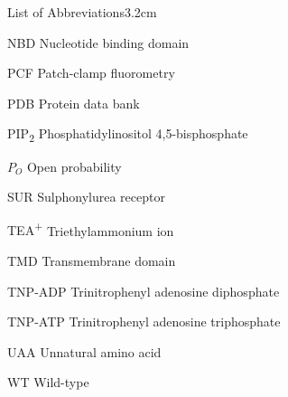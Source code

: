 \begin{mclistof}{List of Abbreviations}{3.2cm}
\item[NBD] Nucleotide binding domain

\item[PCF] Patch-clamp fluorometry

\item[PDB] Protein data bank

\item[PIP\textsubscript{2}] Phosphatidylinositol 4,5-bisphosphate

\item[$P_O$] Open probability

\item[SUR] Sulphonylurea receptor

\item[TEA\textsuperscript{+}] Triethylammonium ion

\item[TMD] Transmembrane domain

\item[TNP-ADP] Trinitrophenyl adenosine diphosphate

\item[TNP-ATP] Trinitrophenyl adenosine triphosphate

\item[UAA] Unnatural amino acid

\item[WT] Wild-type

\end{mclistof}

